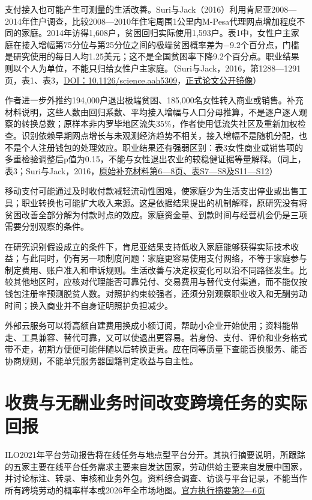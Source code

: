 \documentclass[UTF8,fontset=windows,12pt,a4paper,oneside,openany]{ctexbook}
\begin{document}
支付接入也可能产生可测量的生活改善。Suri与Jack（2016）利用肯尼亚2008—2014年住户调查，比较2008—2010年住宅周围1公里内M-Pesa代理网点增加程度不同的家庭。2014年访得1,608户，贫困回归实际使用1,593户。表1中，女性户主家庭在接入增幅第75分位与第25分位之间的极端贫困概率差为\ensuremath{-}9.2个百分点，门槛是研究使用的每日人均1.25美元；这不是全国贫困率下降9.2个百分点。职业结果则以个人为单位，不能只归给女性户主家庭。（Suri与Jack，2016，第1288—1291页，表1、表3，\href{https://doi.org/10.1126/science.aah5309}{DOI：10.1126/science.aah5309}，\href{https://www.jefftk.com/suri2016.pdf}{正式论文公开镜像}）

作者进一步外推约194,000户退出极端贫困、185,000名女性转入商业或销售。补充材料说明，这些人数由回归系数、平均接入增幅与人口分母推算，不是逐户逐人观察的转换总数；原样本非内罗毕地区流失35\%，作者使用低流失社区及重新加权检查。识别依赖早期网点增长与未观测经济趋势不相关，接入增幅不是随机分配，也不是个人注册钱包的处理效应。职业结果还有强弱区别：表3女性商业或销售项的多重检验调整后p值为0.15，不能与女性退出农业的较稳健证据等量解释。（同上，表3；Suri与Jack，2016，\href{https://www.jefftk.com/suri2016-supp.pdf}{原始补充材料第6—8页、表S7—S8及S11—S12}）

移动支付可能通过及时收付款减轻流动性困难，使家庭少为生活支出停业或出售工具；职业转换也可能扩大收入来源。这是依据结果提出的机制解释，原研究没有将贫困改善全部分解为付款时点的效应。家庭资金量、到款时间与经营机会仍是三项需要分别观察的条件。

在研究识别假设成立的条件下，肯尼亚结果支持低收入家庭能够获得实际技术收益；与此同时，仍有另一项制度问题：家庭更容易使用支付网络，不等于家庭参与制定费用、账户准入和申诉规则。生活改善与决定权变化可以沿不同路径发生。比较其他地区时，应核对代理能否可靠兑付、交易费用与替代支付渠道，而不能仅按钱包注册率预测脱贫人数。对照护约束较强者，还须分别观察职业收入和无酬劳动时间；换入商业并不自身证明照护负担减少。

外部云服务可以将高额自建费用换成小额订阅，帮助小企业开始使用；资料能带走、工具兼容、替代可靠，又可以使退出更容易。若身份、支付、评价和业务格式带不走，初期方便便可能伴随以后转换更贵。应在同等质量下查能否换服务、能否协商规则，不能单凭服务器国籍判定收益与自主性。

\section{收费与无酬业务时间改变跨境任务的实际回报}

ILO2021年平台劳动报告将在线任务与地点型平台分开。其执行摘要说明，所跟踪的五家主要在线平台任务需求主要来自发达国家，劳动供给主要来自发展中国家，并讨论标注、转录、审核和业务外包。资料综合调查、访谈与平台记录，不能当作所有跨境劳动的概率样本或2026年全市场地图。\href{https://www.ilo.org/sites/default/files/wcmsp5/groups/public/\%40dgreports/\%40dcomm/documents/publication/wcms_771672.pdf}{官方执行摘要第2—6页}
\end{document}
